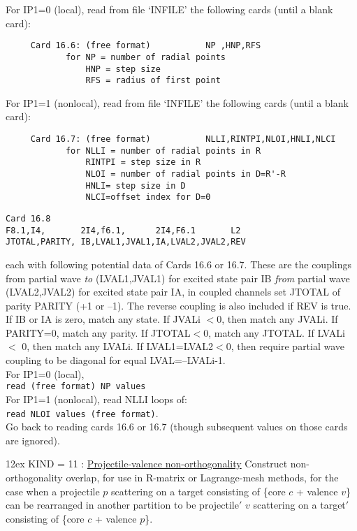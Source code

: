 \documentclass[11pt]{article}
\begin{document}
For IP1=0 (local), read from file `INFILE' the following cards
   (until a blank card):
\begin{verbatim}
     Card 16.6: (free format)           NP ,HNP,RFS
            for NP = number of radial points
                HNP = step size
                RFS = radius of first point
\end{verbatim}
For IP1=1 (nonlocal), read from file `INFILE' the following cards
   (until a blank card):
\begin{verbatim}
     Card 16.7: (free format)           NLLI,RINTPI,NLOI,HNLI,NLCI
            for NLLI = number of radial points in R
                RINTPI = step size in R
                NLOI = number of radial points in D=R'-R
                HNLI= step size in D
                NLCI=offset index for D=0
\end{verbatim}

\begin{verbatim}
Card 16.8
F8.1,I4,       2I4,f6.1,      2I4,F6.1       L2
JTOTAL,PARITY, IB,LVAL1,JVAL1,IA,LVAL2,JVAL2,REV
\end{verbatim}
each with following potential data of Cards 16.6 or 16.7.
These are the couplings from partial wave {\em to}  (LVAL1,JVAL1) for excited state pair IB
{\em from} partial wave (LVAL2,JVAL2) for excited state pair IA, in coupled channels set JTOTAL of parity PARITY (+1 or --1). 
The reverse coupling is also included if REV is true.\\

If IB or IA is zero, match any state. If JVALi $< $0, then match any JVALi. If PARITY=0, match any parity.
If JTOTAL$<$0, match any JTOTAL.  If LVALi $<$ 0, then match any LVALi.
If LVAL1=LVAL2$<$0, then require partial wave coupling to be diagonal for equal LVAL=--LVALi-1.\\


For IP1=0 (local), \\
  \hspace*{8mm} {\tt read (free format) NP values}\\

For IP1=1 (nonlocal), read NLLI loops of:\\
      \hspace*{8mm} {\tt read NLOI values (free format)}.\\

Go back to reading cards 16.6 or 16.7 (though subsequent values on those cards are ignored).
\bigskip

\hangindent 12ex
KIND = 11 :
\underline{Projectile-valence non-orthogonality}
Construct non-orthogonality overlap, for use in R-matrix or Lagrange-mesh methods,  for the case when a 
projectile $p$ scattering on a target consisting of \{core $c$ + valence $v$\} can be rearranged in another partition 
to be projectile$'$ $v$ scattering on a target$'$ consisting of \{core $c$ + valence $p$\}.
\end{document}
